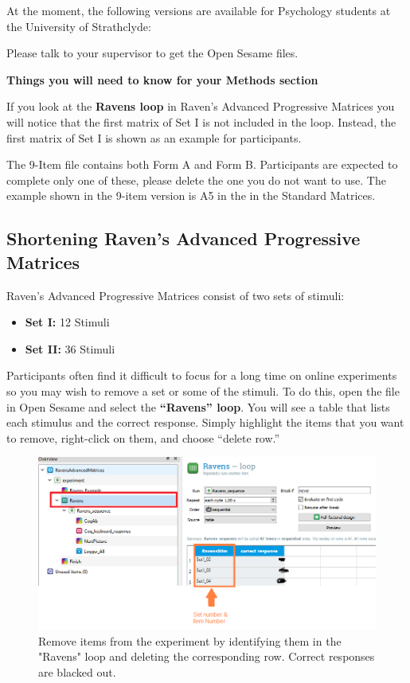 \documentclass[
]{book}
\providecommand{\tightlist}{%
  \setlength{\itemsep}{0pt}\setlength{\parskip}{0pt}}
\begin{document}
At the moment, the following versions are available for Psychology students at the University of Strathclyde:

Please talk to your supervisor to get the Open Sesame files.

\textbf{Things you will need to know for your Methods section}

If you look at the \textbf{Ravens loop} in Raven's Advanced Progressive Matrices you will notice that the first matrix of Set I is not included in the loop. Instead, the first matrix of Set I is shown as an example for participants.

The 9-Item file contains both Form A and Form B. Participants are expected to complete only one of these, please delete the one you do not want to use. The example shown in the 9-item version is A5 in the in the Standard Matrices.

\hypertarget{shortening-ravens-advanced-progressive-matrices}{%
\subsection{Shortening Raven's Advanced Progressive Matrices}\label{shortening-ravens-advanced-progressive-matrices}}

Raven's Advanced Progressive Matrices consist of two sets of stimuli:

\begin{itemize}
\tightlist
\item
  \textbf{Set I:} 12 Stimuli
\item
  \textbf{Set II:} 36 Stimuli
\end{itemize}

Participants often find it difficult to focus for a long time on online experiments so you may wish to remove a set or some of the stimuli. To do this, open the file in Open Sesame and select the \textbf{``Ravens'' loop}. You will see a table that lists each stimulus and the correct response. Simply highlight the items that you want to remove, right-click on them, and choose ``delete row.''

\begin{figure}

{\centering \includegraphics[width=0.99\linewidth]{images/AdvancedRPM} 

}

\caption{Remove items from the experiment by identifying them in the "Ravens" loop and deleting the corresponding row. Correct responses are blacked out.}\label{fig:Figure1-1}
\end{figure}
\end{document}
